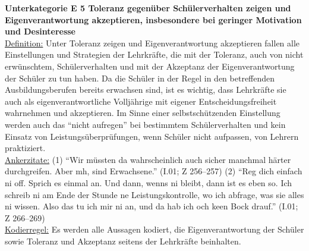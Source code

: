 \textbf{Unterkategorie E 5 Toleranz gegenüber Schülerverhalten zeigen und Eigenverantwortung akzeptieren, insbesondere bei geringer Motivation und Desinteresse}\\
\underline{Definition:} Unter Toleranz zeigen und Eigenverantwortung akzeptieren fallen alle Einstellungen und Strategien der Lehrkräfte, die mit der Toleranz, auch von nicht erwünschtem, Schülerverhalten und mit der Akzeptanz der Eigenverantwortung der Schüler zu tun haben. Da die Schüler in der Regel in den betreffenden Ausbildungsberufen bereits erwachsen sind, ist es wichtig, dass Lehrkräfte sie auch als eigenverantwortliche Volljährige mit eigener Entscheidungsfreiheit wahrnehmen und akzeptieren. Im Sinne einer selbstschützenden Einstellung werden auch das "`nicht aufregen"' bei bestimmtem Schülerverhalten und kein Einsatz von Leistungsüberprüfungen, wenn Schüler nicht aufpassen, von Lehrern praktiziert.\\
\underline{Ankerzitate:} (1) "`Wir müssten da wahrscheinlich auch sicher manchmal härter durchgreifen. Aber mh, sind Erwachsene."' (I.01; Z 256--257) (2) "`Reg dich einfach ni off. Sprich es einmal an. Und dann, wenns ni bleibt, dann ist es eben so. Ich schreib ni am Ende der Stunde ne Leistungskontrolle, wo ich abfrage, was sie alles ni wissen. Also das tu ich mir ni an, und da hab ich och keen Bock drauf."' (I.01; Z 266--269)\\
\underline{Kodierregel:} Es werden alle Aussagen kodiert, die Eigenverantwortung der Schüler sowie Toleranz und Akzeptanz seitens der Lehrkräfte beinhalten.\\

